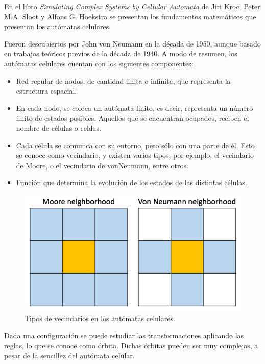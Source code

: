 En el libro \textit{Simulating Complex Systems by Cellular Automata} de Jiri Kroc, Peter M.A. Sloot y Alfons G. Hoekstra
\cite{cellular-automata} se presentan los fundamentos matemáticos que presentan los autómatas celulares.

Fueron descubiertos por John von Neumann en la década de 1950, aunque basado en trabajos teóricos previos de la
década de 1940. A modo de resumen, los autómatas celulares cuentan con los siguientes componentes:

\begin{itemize}
    \item Red regular de nodos, de cantidad finita o infinita, que representa la estructura espacial.
    \item En cada nodo, se coloca un autómata finito, es decir, representa un número finito de estados posibles.
    Aquellos que se encuentran ocupados, reciben el nombre de células o celdas.
    \item Cada célula se comunica con su entorno, pero sólo con una parte de él. Esto se conoce como vecindario,
    y existen varios tipos, por ejemplo, el vecindario de Moore, o el vecindario de vonNeumann, entre otros.
    \item Función que determina la evolución de los estados de las distintas células.
\end{itemize}

\begin{figure}[h]
\centering
\includegraphics[scale=0.6]{figures/automata_neighboor}
\caption{Tipos de vecindarios en los autómatas celulares.}
\end{figure}

Dada una configuración se puede estudiar las transformaciones aplicando las reglas,
lo que se conoce como órbita. Dichas órbitas pueden ser muy complejas, a pesar de
la sencillez del autómata celular.

